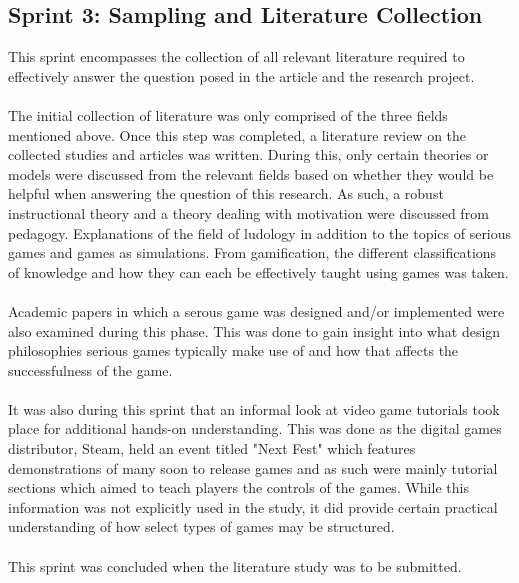 \subsection{Sprint 3: Sampling and Literature Collection}
This sprint encompasses the collection of all relevant literature required to effectively answer the question posed in the article and the research project. 
\\\\
The initial collection of literature was only comprised of the three fields mentioned above. Once this step was completed, a literature review on the collected studies and articles was written. During this, only certain theories or models were discussed from the relevant fields based on whether they would be helpful when answering the question of this research. As such, a robust instructional theory and a theory dealing with motivation were discussed from pedagogy. Explanations of the field of ludology in addition to the topics of serious games and games as simulations. From gamification, the different classifications of knowledge and how they can each be effectively taught using games was taken. 
\\\\
Academic papers in which a serous game was designed and/or implemented were also examined during this phase. This was done to gain insight into what design philosophies serious games typically make use of and how that affects the successfulness of the game. 
\\\\
It was also during this sprint that an informal look at video game tutorials took place for additional hands-on understanding. This was done as the digital games distributor, Steam, held an event titled "Next Fest" which features demonstrations of many soon to release games and as such were mainly tutorial sections which aimed to teach players the controls of the games. While this information was not explicitly used in the study, it did provide certain practical understanding of how select types of games may be structured.
\\\\
This sprint was concluded when the literature study was to be submitted.

